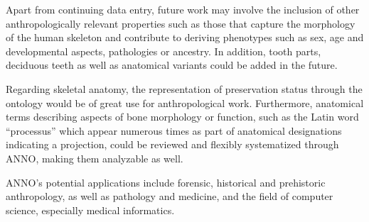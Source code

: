 \documentclass[sw]{iosart2x}
\begin{document}
Apart from continuing data entry, future work may involve the inclusion of other anthropologically relevant properties such as those that capture the morphology of the human skeleton and contribute to deriving phenotypes such as sex, age and developmental aspects, pathologies or ancestry.
In addition, tooth parts, deciduous teeth as well as anatomical variants could be added in the future.

Regarding skeletal anatomy, the representation of preservation status through the ontology would be of great use for anthropological work.
Furthermore, anatomical terms describing aspects of bone morphology or function, such as the Latin word \enquote{processus} which appear numerous times as part of anatomical designations indicating a projection, could be reviewed and flexibly systematized through ANNO, making them analyzable as well.

ANNO's potential applications include forensic, historical and prehistoric anthropology, as well as pathology and medicine, and the field of computer science, especially medical informatics.
\end{document}
